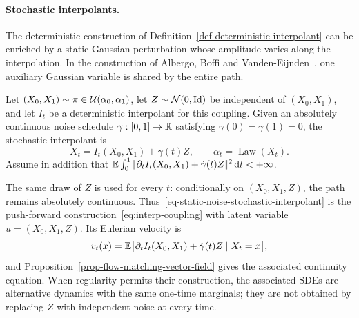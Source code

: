 \paragraph{Stochastic interpolants.}
The deterministic construction of Definition~\ref{def-deterministic-interpolant} can be enriched by a static Gaussian perturbation whose amplitude varies along the interpolation. In the construction of Albergo, Boffi and Vanden-Eijnden~\cite{Albergo2025StochasticInterpolants}, one auxiliary Gaussian variable is shared by the entire path.
\begin{defn}\label{def-stochastic-interpolant}
Let $(X_0,X_1)\sim\pi\in\mathcal{U}(\alpha_0,\alpha_1)$, let $Z\sim\mathcal{N}(0,\mathrm{Id})$ be independent of $(X_0,X_1)$, and let $I_t$ be a deterministic interpolant for this coupling. Given an absolutely continuous noise schedule $\gamma:[0,1]\to\mathbb{R}$ satisfying $\gamma(0)=\gamma(1)=0$, the stochastic interpolant is
\begin{equation}\label{eq-static-noise-stochastic-interpolant}
	X_t=I_t(X_0,X_1)+\gamma(t)Z,
	\qquad \alpha_t=\operatorname{Law}(X_t).
\end{equation}
Assume in addition that $\mathbb{E}\int_0^1|\!| \partial_tI_t(X_0,X_1)+\dot\gamma(t)Z |\!|^2\,\mathrm{d} t<+\infty$.
\end{defn}
The same draw of $Z$ is used for every $t$: conditionally on $(X_0,X_1,Z)$, the path remains absolutely continuous. Thus~\eqref{eq-static-noise-stochastic-interpolant} is the push-forward construction~\eqref{eq:interp-coupling} with latent variable $u=(X_0,X_1,Z)$. Its Eulerian velocity is
\[
	v_t(x)=\mathbb{E}\bigl[\partial_tI_t(X_0,X_1)+\dot\gamma(t)Z\mid X_t=x\bigr],
\]
and Proposition~\ref{prop-flow-matching-vector-field} gives the associated continuity equation. When regularity permits their construction, the associated SDEs are alternative dynamics with the same one-time marginals; they are not obtained by replacing $Z$ with independent noise at every time.

